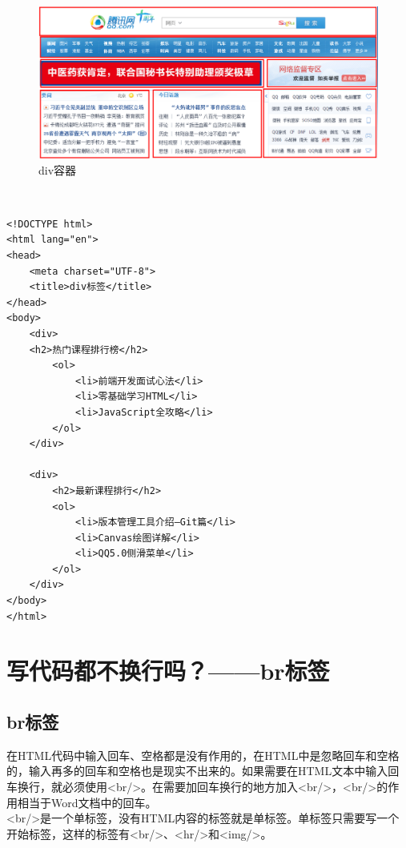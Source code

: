 \begin{figure}[H]
	\centering
	\includegraphics[scale=0.5]{img/C2/2-3/1.png}
	\caption{div容器}
\end{figure}

 \\

\begin{lstlisting}[style=htmlcssjs]
<!DOCTYPE html>
<html lang="en">
<head>
    <meta charset="UTF-8">
    <title>div标签</title>
</head>
<body>
    <div>
    <h2>热门课程排行榜</h2>
        <ol>
            <li>前端开发面试心法</li>
            <li>零基础学习HTML</li>
            <li>JavaScript全攻略</li>
        </ol>
    </div>

    <div>
        <h2>最新课程排行</h2>
        <ol>
            <li>版本管理工具介绍—Git篇</li>
            <li>Canvas绘图详解</li>
            <li>QQ5.0侧滑菜单</li>
        </ol>
    </div>
</body>
</html>
\end{lstlisting}

\newpage

\section{写代码都不换行吗？——br标签}

\subsection{br标签}

在HTML代码中输入回车、空格都是没有作用的，在HTML中是忽略回车和空格的，输入再多的回车和空格也是现实不出来的。如果需要在HTML文本中输入回车换行，就必须使用<br/>。在需要加回车换行的地方加入<br/>，<br/>的作用相当于Word文档中的回车。 \\

<br/>是一个单标签，没有HTML内容的标签就是单标签。单标签只需要写一个开始标签，这样的标签有<br/>、<hr/>和<img/>。 \\

